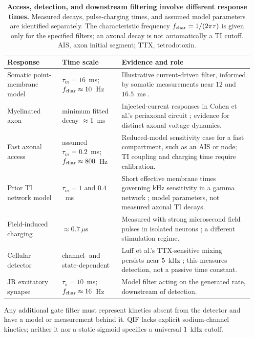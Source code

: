 \begin{table}[h]
\centering\small
\renewcommand{\arraystretch}{1.15}
\begin{tabular}{@{}>{\raggedright\arraybackslash}p{2.8cm}
>{\raggedright\arraybackslash}p{3.5cm}
>{\raggedright\arraybackslash}p{8.6cm}@{}}
\toprule
Response & Time scale & Evidence and role \\
\midrule
Somatic point-membrane model & $\tau_m=16$~ms; $f_{\rm char}\approx10$~Hz &
Illustrative current-driven filter, informed by somatic measurements near $12$ and $16.5$~ms
\cite{deitcher2017,eyal2016}. \\
Myelinated axon & minimum fitted decay $\approx1$~ms &
Injected-current responses in Cohen et al.'s periaxonal circuit
\cite{cohen2020periaxonal}; evidence for distinct axonal voltage dynamics. \\
Fast axonal access & assumed $\tau_m=0.2$~ms; $f_{\rm char}\approx800$~Hz &
Reduced-model sensitivity case for a fast compartment, such as an AIS or node;
TI coupling and charging time require calibration. \\
Prior TI network model & $\tau_m=1$ and $0.4$~ms &
Short effective membrane times governing kHz sensitivity in a gamma network
\cite{esmaeilpour2021}; model parameters, not measured axonal TI decays. \\
Field-induced charging & $\approx0.7~\mu$s &
Measured with strong microsecond field pulses in isolated neurons
\cite{semenov2025}; a different stimulation regime. \\
Cellular detector & channel- and state-dependent &
Luff et al.'s TTX-sensitive mixing persists near $5$~kHz
\cite{luff2024mixer}; this measures detection, not a passive time constant. \\
JR excitatory synapse & $\tau_s=10$~ms; $f_{\rm char}\approx16$~Hz &
Model filter acting on the generated rate, downstream of detection. \\
\bottomrule
\end{tabular}
\caption{\textbf{Access, detection, and downstream filtering involve different response
times.} Measured decays, pulse-charging times, and assumed model parameters are
identified separately. The characteristic frequency $f_{\rm char}=1/(2\pi\tau)$
is given only for the specified filters; an axonal decay is not automatically a TI
cutoff. AIS, axon initial segment; TTX, tetrodotoxin.}
\label{tab:doors}
\end{table}

Any additional gate filter must represent kinetics absent from the detector
and have a model or measurement behind it. QIF lacks explicit sodium-channel
kinetics; neither it nor a static sigmoid specifies a universal $1$~kHz cutoff.


